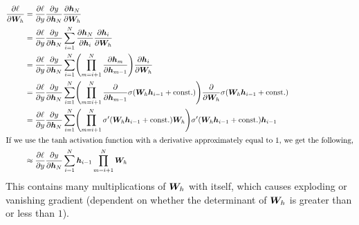 \begin{align*}
  \pdv{\ell}{\mat{W}_h} &= \pdv{\ell}{y} \pdv{y}{\vec{h}_N} \pdv{\vec{h}_N}{\mat{W}_h} \\
  &= \pdv{\ell}{y} \pdv{y}{\vec{h}_N} \sum_{i=1}^N \pdv{\vec{h}_N}{\vec{h}_i} \pdv{\vec{h}_i}{\mat{W}_h} \\
  &= \pdv{\ell}{y} \pdv{y}{\vec{h}_N} \sum_{i=1}^N \lft( \prod_{m=i+1}^N \pdv{\vec{h}_m}{\vec{h}_{m-1}} \rgt) \pdv{\vec{h}_i}{\mat{W}_h} \\
  &= \pdv{\ell}{y} \pdv{y}{\vec{h}_N} \sum_{i=1}^N \lft( \prod_{m=i+1}^N \pdv*{\sigma\lft( \mat{W}_h\vec{h}_{i-1} + \const \rgt)}{\vec{h}_{m-1}} \rgt) \pdv*{\sigma \lft( \mat{W}_h\vec{h}_{i-1} + \const \rgt)}{\mat{W}_h} \\
  &= \pdv{\ell}{y} \pdv{y}{\vec{h}_N} \sum_{i=1}^N \lft( \prod_{m=i+1}^N \sigma' \lft( \mat{W}_h\vec{h}_{i-1} + \const \rgt) \mat{W}_h \rgt) \sigma'\lft( \mat{W}_h\vec{h}_{i-1} + \const \rgt) \vec{h}_{i-1} \\
  \intertext{If we use the $\tanh$ activation function with a derivative
  approximately equal to $1$, we get the following,}
  &\approx \pdv{\ell}{y} \pdv{y}{\vec{h}_N} \sum_{i=1}^N \vec{h}_{i-1} \prod_{m=i+1}^N \mat{W}_h \\
\end{align*}
This contains many multiplications of $\bm{W}_h$ with itself, which causes
exploding or vanishing gradient (dependent on whether the determinant of
$\bm{W}_h$ is greater than or less than $1$).
